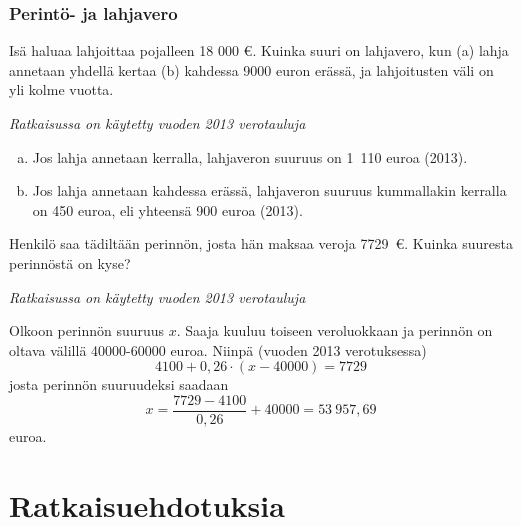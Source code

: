 \documentclass[a4paper,10pt]{article}\usepackage[]{graphicx}\usepackage[]{color}
\makeatletter
\newenvironment{kframe}{%
 \def\at@end@of@kframe{}%
 \ifinner\ifhmode%
  \def\at@end@of@kframe{\end{minipage}}%
  \begin{minipage}{\columnwidth}%
 \fi\fi%
 \def\FrameCommand##1{\hskip\@totalleftmargin \hskip-\fboxsep
 \colorbox{shadecolor}{##1}\hskip-\fboxsep
     \hskip-\linewidth \hskip-\@totalleftmargin \hskip\columnwidth}%
 \MakeFramed {\advance\hsize-\width
   \@totalleftmargin\z@ \linewidth\hsize
   \@setminipage}}%
 {\par\unskip\endMakeFramed%
 \at@end@of@kframe}
\newenvironment{knitrout}{}{} %
\makeatother
\begin{document}
\subsubsection*{Perintö- ja lahjavero}

\begin{question} Isä haluaa lahjoittaa pojalleen 18 000 \euro. Kuinka suuri on lahjavero, kun (a) lahja annetaan yhdellä kertaa (b) kahdessa 9000 euron erässä, ja lahjoitusten väli on yli kolme vuotta.
\end{question}
\begin{solution}
\emph{Ratkaisussa on käytetty vuoden 2013 verotauluja}
\begin{knitrout}
\color{fgcolor}\begin{kframe}


{\ttfamily\noindent\bfseries\color{errorcolor}{\#\# Error in library(xtable): there is no package called 'xtable'}}

{\ttfamily\noindent\bfseries{}}\end{kframe}
\end{knitrout}
	\begin{enumerate}[(a)]
		\item Jos lahja annetaan kerralla, lahjaveron suuruus on 1~110 euroa (2013).
		\item Jos lahja annetaan kahdessa erässä, lahjaveron suuruus kummallakin kerralla on 450 euroa, eli yhteensä 900 euroa (2013). 
	\end{enumerate}
\end{solution}

\begin{question} Henkilö saa tädiltään perinnön, josta hän maksaa veroja 7729~\euro. Kuinka suuresta perinnöstä on kyse?
\end{question}
\begin{solution}
\emph{Ratkaisussa on käytetty vuoden 2013 verotauluja}

  Olkoon perinnön suuruus \(x\). Saaja kuuluu toiseen veroluokkaan ja perinnön on oltava välillä 40000-60000 euroa. Niinpä (vuoden 2013 verotuksessa)
\[
	4100 + 0,26\cdot(x - 40000) = 7729
\]
josta perinnön suuruudeksi saadaan
\[
	x = \frac{7729 - 4100}{0,26} + 40000 = 53~957{,}69 
\]
euroa.
\end{solution}


\newpage
\section*{Ratkaisuehdotuksia}
\printsolutions
\end{document}
